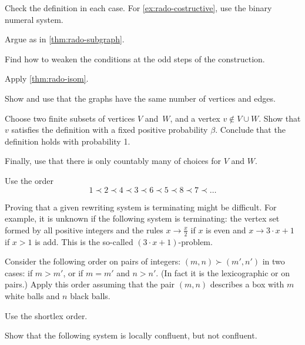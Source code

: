 Check the definition in each case.
For \ref{ex:rado-costructive}, use the binary numeral system.


Argue as in \ref{thm:rado-subgraph}.

Find how to weaken the conditions at the odd steps of the construction.

Apply \ref{thm:rado-isom}.

Show and use that the graphs have the same number of vertices and edges.

Choose two finite subsets of vertices $V$ and~$W$, and a vertex $v\notin V\cup W$.
Show that $v$ satisfies the definition with a fixed positive probability $\beta$.
Conclude that the definition holds with probability 1.

Finally, use that there is only countably many of choices for $V$ and $W$.

Use the order 
\[1\prec 2\prec 4\prec 3\prec 6\prec 5\prec 8\prec 7\prec\dots\]

Proving that a given rewriting system is terminating might be difficult.
For example,
it is unknown if the following system is terminating:
the vertex set formed by all positive integers and the rules $x\to \tfrac x2$ if $x$ is even and $x\to 3\cdot x+1$ if $x>1$ is add.
This is the so-called $(3\cdot x+1)$-problem.

Consider the following order on pairs of integers:
$(m,n)\succ(m',n')$ in two cases: if $m>m'$, or if $m=m'$ and $n>n'$.
(In fact it is the lexicographic or on pairs.)
Apply this order assuming that the pair $(m,n)$ describes a box with $m$ white balls and $n$ black balls.

Use the shortlex order.

Show that the following system is locally confluent, but not confluent.

\centering
{}

